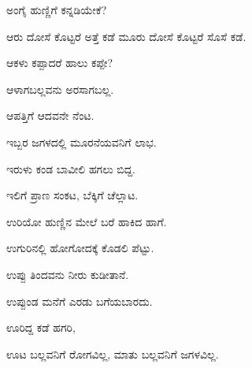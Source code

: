\noindent\hspace*{0.6em}\kbvbullet\hspace{0.55em}ಅಂಗೈ ಹುಣ್ಣಿಗೆ ಕನ್ನಡಿಯೇಕೆ?\par

\noindent\hspace*{0.6em}\kbvbullet\hspace{0.55em}ಆರು ದೋಸೆ ಕೊಟ್ಟರೆ ಅತ್ತೆ ಕಡೆ ಮೂರು ದೋಸೆ ಕೊಟ್ಟರೆ ಸೊಸೆ ಕಡೆ.\par

\noindent\hspace*{0.6em}\kbvbullet\hspace{0.55em}ಆಕಳು ಕಪ್ಪಾದರೆ ಹಾಲು ಕಪ್ಪೇ?\par

\noindent\hspace*{0.6em}\kbvbullet\hspace{0.55em}ಆಳಾಗಬಲ್ಲವನು ಅರಸಾಗಬಲ್ಲ.\par

\noindent\hspace*{0.6em}\kbvbullet\hspace{0.55em}ಆಪತ್ತಿಗೆ ಆದವನೇ ನೆಂಟ.\par

\noindent\hspace*{0.6em}\kbvbullet\hspace{0.55em}ಇಬ್ಬರ ಜಗಳದಲ್ಲಿ ಮೂರನೆಯವನಿಗೆ ಲಾಭ.\par

\noindent\hspace*{0.6em}\kbvbullet\hspace{0.55em}ಇರುಳು ಕಂಡ ಬಾವೀಲಿ ಹಗಲು ಬಿದ್ದ.\par

\noindent\hspace*{0.6em}\kbvbullet\hspace{0.55em}ಇಲಿಗೆ ಪ್ರಾಣ ಸಂಕಟ, ಬೆಕ್ಕಿಗೆ ಚೆಲ್ಲಾಟ.\par

\noindent\hspace*{0.6em}\kbvbullet\hspace{0.55em}ಉರಿಯೋ ಹುಣ್ಣಿನ ಮೇಲೆ ಬರೆ ಹಾಕಿದ ಹಾಗೆ.\par

\noindent\hspace*{0.6em}\kbvbullet\hspace{0.55em}ಉಗುರಿನಲ್ಲಿ ಹೋಗೋದಕ್ಕೆ ಕೊಡಲಿ ಪೆಟ್ಟು.\par

\noindent\hspace*{0.6em}\kbvbullet\hspace{0.55em}ಉಪ್ಪು ತಿಂದವನು ನೀರು ಕುಡೀತಾನೆ.\par

\noindent\hspace*{0.6em}\kbvbullet\hspace{0.55em}ಉಪ್ಪುಂಡ ಮನೆಗೆ ಎರಡು ಬಗೆಯಬಾರದು.\par

\noindent\hspace*{0.6em}\kbvbullet\hspace{0.55em}ಊರಿದ್ದ ಕಡೆ ಹಗರಿ,\par

\noindent\hspace*{0.6em}\kbvbullet\hspace{0.55em}ಊಟ ಬಲ್ಲವನಿಗೆ ರೋಗವಿಲ್ಲ, ಮಾತು ಬಲ್ಲವನಿಗೆ ಜಗಳವಿಲ್ಲ.\par
